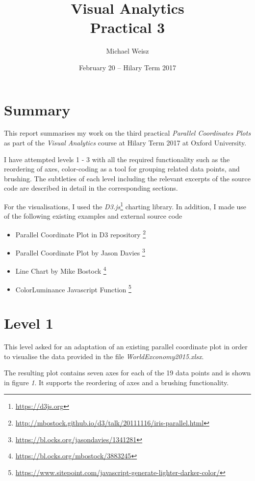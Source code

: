 \documentclass[]{article}
\title{Visual Analytics \\ Practical 3}
\author{Michael Weisz}
\date{February 20 -- Hilary Term 2017 }
\begin{document}
\maketitle


\section*{Summary}
This report summarises my work on the third practical \emph{Parallel Coordinates Plots} as part of the \emph{Visual Analytics} course at Hilary Term 2017 at Oxford University.

I have attempted levels 1 - 3 with all the required functionality such as the reordering of axes, color-coding as a tool for grouping related data points, and brushing. The subtleties of each level including the relevant excerpts of the source code are described in detail in the corresponding sections.

For the visualisations, I used the \emph{D3.js}\footnote{\url{https://d3js.org}} 
charting library. In addition, I made use of the following existing examples and external source code


\begin{itemize}
	\item Parallel Coordinate Plot in D3 repository \footnote{\url{http://mbostock.github.io/d3/talk/20111116/iris-parallel.html}}
	\item Parallel Coordinate Plot by Jason Davies \footnote{\url{https://bl.ocks.org/jasondavies/1341281}}
	\item Line Chart by Mike Bostock \footnote{\url{https://bl.ocks.org/mbostock/3883245}}
	\item ColorLuminance Javascript Function \footnote{\url{https://www.sitepoint.com/javascript-generate-lighter-darker-color/}}
\end{itemize}




\section*{Level 1}
This level asked for an adaptation of an existing parallel coordinate plot in order to visualise the data provided in the file \emph{WorldExconomy2015.xlsx}.

The resulting plot contains seven axes for each of the 19 data points and is shown in figure \emph{1}. It supports the reordering of axes and a brushing functionality.   
\end{document}
